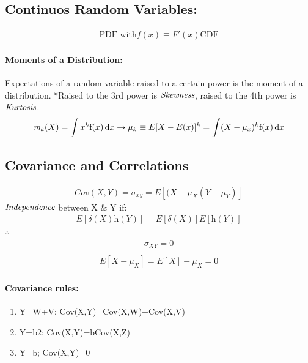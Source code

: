 \subsection{Continuos Random Variables:}
\begin{eqnarray*}
\text{PDF with}f(x) \equiv F'(x)\text{CDF}
\end{eqnarray*}





\paragraph{Moments of a Distribution:}
Expectations of a random variable raised to a certain power is the moment of a distribution. *Raised to the 3rd power is $\emph{Skewness}$, raised to the 4th power is $\emph{Kurtosis}$.\\ 

\begin{eqnarray}
\emph{m}_{k}(X)=\int x^{k} \mathrm{f}(x)\,\mathrm{d}x\rightarrow \mu_{k}\equiv E[X-E(x)]^{k}=\int (X-\mu_{x})^{k} \mathrm{f}(x)\,\mathrm{d}x
\end{eqnarray}

\subsection{Covariance and Correlations}
\begin{eqnarray}
Cov(X,Y)=\sigma_{xy}=E[(X-\mu_{X}(Y-\mu_{Y})]
\end{eqnarray}
$\emph{Independence}$ between X $\&$ Y if:
\begin{eqnarray}
E[\delta(X)\textit{h}(Y)]=E[\delta(X)]E[\textit{h}(Y)] 
\end{eqnarray}
$\therefore$
\begin{eqnarray}
\sigma_{XY}=0\\
\end{eqnarray}
\begin{eqnarray}
E[X-\mu_{X}]=E[X]-\mu_{X}=0
\end{eqnarray}


\paragraph{Covariance rules:}
\begin{enumerate}[(1)]
\item Y=W+V; Cov(X,Y)=Cov(X,W)+Cov(X,V)
\item Y=b2; Cov(X,Y)=bCov(X,Z)
\item Y=b; Cov(X,Y)=0
\end{enumerate}

